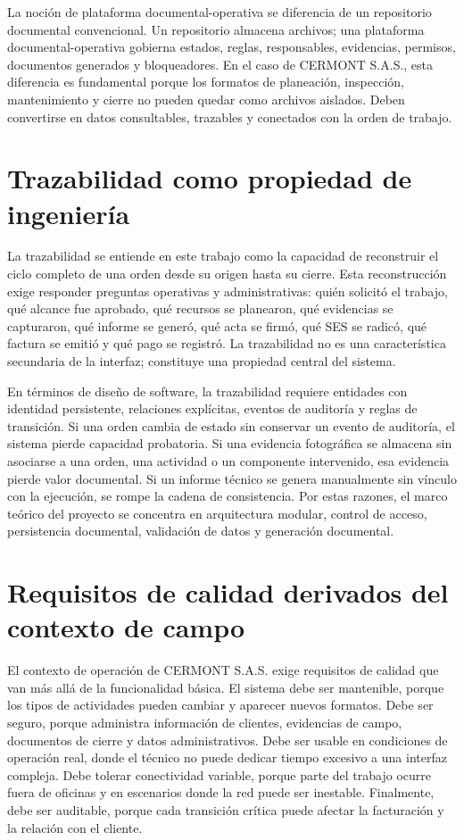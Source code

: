 La noción de plataforma documental-operativa se diferencia de un repositorio documental convencional. Un repositorio almacena archivos; una plataforma documental-operativa gobierna estados, reglas, responsables, evidencias, permisos, documentos generados y bloqueadores. En el caso de CERMONT S.A.S., esta diferencia es fundamental porque los formatos de planeación, inspección, mantenimiento y cierre no pueden quedar como archivos aislados. Deben convertirse en datos consultables, trazables y conectados con la orden de trabajo.

\section{Trazabilidad como propiedad de ingeniería}
\label{sec:trazabilidad-propiedad-ingenieria}

La trazabilidad se entiende en este trabajo como la capacidad de reconstruir el ciclo completo de una orden desde su origen hasta su cierre. Esta reconstrucción exige responder preguntas operativas y administrativas: quién solicitó el trabajo, qué alcance fue aprobado, qué recursos se planearon, qué evidencias se capturaron, qué informe se generó, qué acta se firmó, qué SES se radicó, qué factura se emitió y qué pago se registró. La trazabilidad no es una característica secundaria de la interfaz; constituye una propiedad central del sistema.

En términos de diseño de software, la trazabilidad requiere entidades con identidad persistente, relaciones explícitas, eventos de auditoría y reglas de transición. Si una orden cambia de estado sin conservar un evento de auditoría, el sistema pierde capacidad probatoria. Si una evidencia fotográfica se almacena sin asociarse a una orden, una actividad o un componente intervenido, esa evidencia pierde valor documental. Si un informe técnico se genera manualmente sin vínculo con la ejecución, se rompe la cadena de consistencia. Por estas razones, el marco teórico del proyecto se concentra en arquitectura modular, control de acceso, persistencia documental, validación de datos y generación documental.

\section{Requisitos de calidad derivados del contexto de campo}
\label{sec:requisitos-calidad-contexto-campo}

El contexto de operación de CERMONT S.A.S. exige requisitos de calidad que van más allá de la funcionalidad básica. El sistema debe ser mantenible, porque los tipos de actividades pueden cambiar y aparecer nuevos formatos. Debe ser seguro, porque administra información de clientes, evidencias de campo, documentos de cierre y datos administrativos. Debe ser usable en condiciones de operación real, donde el técnico no puede dedicar tiempo excesivo a una interfaz compleja. Debe tolerar conectividad variable, porque parte del trabajo ocurre fuera de oficinas y en escenarios donde la red puede ser inestable. Finalmente, debe ser auditable, porque cada transición crítica puede afectar la facturación y la relación con el cliente.

